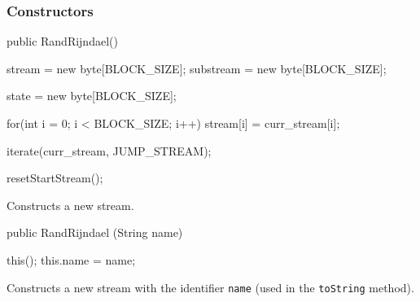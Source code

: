 \subsubsection* {Constructors}

\begin{code}
   public RandRijndael() \begin{hide} {
      stream = new byte[BLOCK_SIZE];
      substream = new byte[BLOCK_SIZE];

      state = new byte[BLOCK_SIZE];

      for(int i = 0; i < BLOCK_SIZE; i++)
         stream[i] = curr_stream[i];

      iterate(curr_stream, JUMP_STREAM);

      resetStartStream();
   }\end{hide}
\end{code}
\begin{tabb} Constructs a new stream.
\end{tabb}
\begin{code}

   public RandRijndael (String name) \begin{hide} {
      this();
      this.name = name;
   }\end{hide}
\end{code}
\begin{tabb} Constructs a new stream with the identifier \texttt{name}
  (used in the \texttt{toString} method).
\end{tabb}
\begin{htmlonly}
\end{htmlonly}

